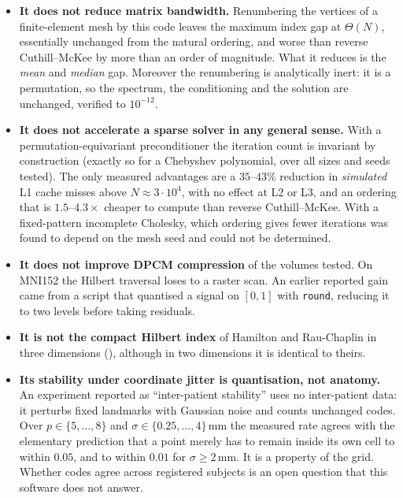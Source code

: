 \documentclass[11pt,a4paper]{article}
\theoremstyle{plain}
\theoremstyle{definition}
\theoremstyle{remark}
\begin{document}
\begin{itemize}
\item \textbf{It does not reduce matrix bandwidth.} Renumbering the
vertices of a finite-element mesh by this code leaves the maximum index gap
at $\Theta(N)$, essentially unchanged from the natural ordering, and worse
than reverse Cuthill--McKee by more than an order of magnitude. What it
reduces is the \emph{mean} and \emph{median} gap. Moreover the renumbering
is analytically inert: it is a permutation, so the spectrum, the
conditioning and the solution are unchanged, verified to $10^{-12}$.

\item \textbf{It does not accelerate a sparse solver in any general sense.}
With a permutation-equivariant preconditioner the iteration count is
invariant by construction (exactly so for a Chebyshev polynomial, over all
sizes and seeds tested). The only measured advantages are a $35$--$43\%$
reduction in \emph{simulated} L1 cache misses above $N\approx3\cdot10^4$,
with no effect at L2 or L3, and an ordering that is $1.5$--$4.3\times$
cheaper to compute than reverse Cuthill--McKee. With a fixed-pattern
incomplete Cholesky, which ordering gives fewer iterations was found to
depend on the mesh seed and could not be determined.

\item \textbf{It does not improve DPCM compression} of the volumes tested.
On MNI152 the Hilbert traversal loses to a raster scan. An earlier reported
gain came from a script that quantised a signal on $[0,1]$ with
\texttt{round}, reducing it to two levels before taking residuals.

\item \textbf{It is not the compact Hilbert index} of Hamilton and
Rau-Chaplin in three dimensions (), although in two
dimensions it is identical to theirs.

\item \textbf{Its stability under coordinate jitter is quantisation, not
anatomy.} An experiment reported as ``inter-patient stability'' uses no
inter-patient data: it perturbs fixed landmarks with Gaussian noise and
counts unchanged codes. Over $p\in\{5,\dots,8\}$ and
$\sigma\in\{0.25,\dots,4\}$\,mm the measured rate agrees with the
elementary prediction that a point merely has to remain inside its own cell
to within $0.05$, and to within $0.01$ for $\sigma\ge2$\,mm. It is a
property of the grid. Whether codes agree across registered subjects is an
open question that this software does not answer.
\end{itemize}
\end{document}
